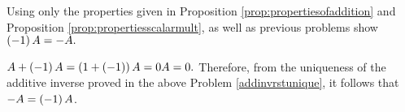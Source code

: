 \begin{enumialphparenastyle}
\begin{ex} Using only the properties given in Proposition \ref{prop:propertiesofaddition} and 
Proposition \ref{prop:propertiesscalarmult}, as well as previous
problems show $\left(-1\right) A=-A.$
\begin{sol}
$A+\left(-1\right) A=\left(1+\left(
-1\right) \right) A=0A=0.$ Therefore, from the uniqueness of the additive
inverse proved in the above Problem \ref{addinvrstunique}, it follows that $
-A=\left(-1\right) A$.
\end{sol}
\end{ex}

\end{enumialphparenastyle}